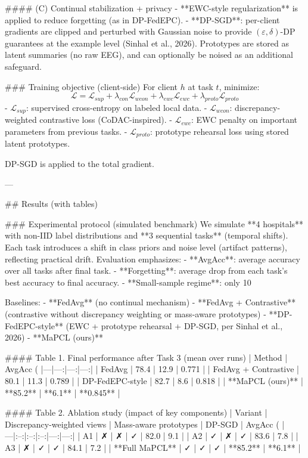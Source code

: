 #### (C) Continual stabilization + privacy  
- **EWC-style regularization** is applied to reduce forgetting (as in DP-FedEPC).  
- **DP-SGD**: per-client gradients are clipped and perturbed with Gaussian noise to provide \((\varepsilon,\delta)\)-DP guarantees at the example level (Sinhal et al., 2026). Prototypes are stored as latent summaries (no raw EEG), and can optionally be noised as an additional safeguard.

### Training objective (client-side)  
For client \(h\) at task \(t\), minimize:
\[
\mathcal{L} = \mathcal{L}_{sup} + \lambda_{con}\mathcal{L}_{wcon} + \lambda_{ewc}\mathcal{L}_{ewc} + \lambda_{proto}\mathcal{L}_{proto}
\]
- \(\mathcal{L}_{sup}\): supervised cross-entropy on labeled local data.  
- \(\mathcal{L}_{wcon}\): discrepancy-weighted contrastive loss (CoDAC-inspired).  
- \(\mathcal{L}_{ewc}\): EWC penalty on important parameters from previous tasks.  
- \(\mathcal{L}_{proto}\): prototype rehearsal loss using stored latent prototypes.

DP-SGD is applied to the total gradient.

---

## Results (with tables)  

### Experimental protocol (simulated benchmark)  
We simulate **4 hospitals** with non-IID label distributions and **3 sequential tasks** (temporal shifts). Each task introduces a shift in class priors and noise level (artifact patterns), reflecting practical drift. Evaluation emphasizes:
- **AvgAcc**: average accuracy over all tasks after final task.  
- **Forgetting**: average drop from each task’s best accuracy to final accuracy.  
- **Small-sample regime**: only 10%

Baselines:  
- **FedAvg** (no continual mechanism)  
- **FedAvg + Contrastive** (contrastive without discrepancy weighting or mass-aware prototypes)  
- **DP-FedEPC-style** (EWC + prototype rehearsal + DP-SGD, per Sinhal et al., 2026)  
- **MaPCL (ours)**

#### Table 1. Final performance after Task 3 (mean over runs)  
| Method | AvgAcc (%
|---|---:|---:|---:|
| FedAvg | 78.4 | 12.9 | 0.771 |
| FedAvg + Contrastive | 80.1 | 11.3 | 0.789 |
| DP-FedEPC-style | 82.7 | 8.6 | 0.818 |
| **MaPCL (ours)** | **85.2** | **6.1** | **0.845** |

#### Table 2. Ablation study (impact of key components)  
| Variant | Discrepancy-weighted views | Mass-aware prototypes | DP-SGD | AvgAcc (%
|---|:--:|:--:|:--:|---:|---:|
| A1 | ✗ | ✗ | ✓ | 82.0 | 9.1 |
| A2 | ✓ | ✗ | ✓ | 83.6 | 7.8 |
| A3 | ✗ | ✓ | ✓ | 84.1 | 7.2 |
| **Full MaPCL** | ✓ | ✓ | ✓ | **85.2** | **6.1** |

